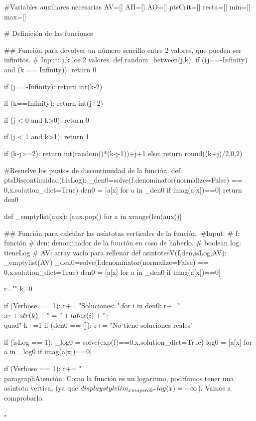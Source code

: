 \begin{sagesilent}

#Variables auxiliares necesarias
AV=[]
AH=[]
AO=[]
ptsCrit=[]
recta=[]
min=[]
max=[]

# Definición de las funciones

## Función para devolver un número sencillo entre 2 valores, que pueden ser infinitos.
# Input: j,k los 2 valores.
def random_between(j,k):
 if ((j==-Infinity) and (k == Infinity)):
  return 0

 if (j==-Infinity):
  return int(k-2)

 if (k==Infinity):
  return int(j+2)

 if (j < 0 and k>0):
  return 0

 if (j < 1 and k>1):
  return 1


 if (k-j>=2):
  return int(random()*(k-j-1))+j+1
 else:
  return round((k+j)/2.0,2)

#Resuelve los puntos de discontinuidad de la función.
def ptsDiscontinuidad(f,isLog):
    _den0=solve(f.denominator(normalize=False) == 0,x,solution_dict=True)
    den0 = [a[x] for a in _den0 if imag(a[x])==0]
    return den0

def _emptylist(aux):
    [aux.pop() for a in xrange(len(aux))]
    
## Función para calcular las asíntotas verticales de la función.
#Input:
# f: función
# den: denominador de la función en caso de haberlo.
# boolean log: tieneLog 
# AV: array vacío para rellenar
def asintotesV(f,den,isLog,AV):
    _emptylist(AV)
    _den0=solve(f.denominator(normalize=False) == 0,x,solution_dict=True)
    den0 = [a[x] for a in _den0 if imag(a[x])==0]

    r=""
    k=0

    if (Verbose == 1):
        r+= "Soluciones: "
        for i in den0:
            r+="$x_"+str(k)+"="+latex(i)+" $;\\quad"
            k+=1
        if (den0 == []):
            r+= "No tiene soluciones reales"

    if (isLog == 1):
        _log0 = solve(exp(f)==0,x,solution_dict=True)
        log0 = [a[x] for a in _log0 if imag(a[x])==0]  

        if (Verbose == 1):
            r+= "\\paragraph{Atención: } Como la función es un logaritmo, podríamos tener una asíntota vertical (ya que $\\displaystyle\\lim_{x\\mapsto 0^+} \\log(x) = -\infty$). Vamos a comprobarlo.\\\\"


\end{sagesilent}
